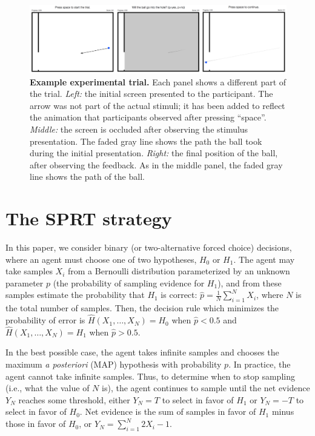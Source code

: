 \documentclass[10pt,letterpaper]{article}
\begin{document}
\begin{figure}[t]
    \begin{center}
        \includegraphics[width=\textwidth]{figures/experiment.png}
        \caption{\textbf{Example experimental trial.} Each panel shows a different part of the trial. \emph{Left:} the initial screen presented to the participant. The arrow was not part of the actual stimuli; it has been added to reflect the animation that participants observed after pressing ``space''. \emph{Middle:}  the screen is occluded after observing the stimulus presentation. The faded gray line shows the path the ball took during the initial presentation. \emph{Right:} the final position of the ball, after observing the feedback. As in the middle panel, the faded gray line shows the path of the ball.}
        \label{fig:experiment}
    \end{center}
\end{figure}

\section{The SPRT strategy}

In this paper, we consider binary (or two-alternative forced choice) decisions, where an agent must choose one of two hypotheses, $H_0$ or $H_1$. The agent may take samples $X_i$ from a Bernoulli distribution parameterized by an unknown parameter $p$ (the probability of sampling evidence for $H_1$), and from these samples estimate the probability that $H_1$ is correct: $\hat{p}=\frac{1}{N}\sum_{i=1}^N X_i$, where $N$ is the total number of samples. Then, the decision rule which minimizes the probability of error is $\hat{H}(X_1,\ldots{},X_N)=H_0$ when $\hat{p}<0.5$ and $\hat{H}(X_1,\ldots{},X_N)=H_1$ when $\hat{p}>0.5$.

In the best possible case, the agent takes infinite samples and chooses the maximum \emph{a posteriori} (MAP) hypothesis with probability $p$. In practice, the agent cannot take infinite samples. Thus, to determine when to stop sampling (i.e., what the value of $N$ is), the agent continues to sample until the net evidence $Y_N$ reaches some threshold, either $Y_N=T$ to select in favor of $H_1$ or $Y_N=-T$ to select in favor of $H_0$. Net evidence is the sum of samples in favor of $H_1$ minus those in favor of $H_0$, or $Y_N=\sum_{i=1}^N 2X_i-1$.
\end{document}
